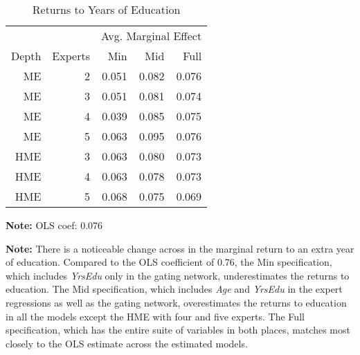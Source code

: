 \documentclass[12pt]{article}
\begin{document}
\begin{table} \centering
  \caption{Returns to Years of Education}
  \begin{threeparttable}
    \begin{tabular}[l]{r r r r r}
  \cmidrule{1-5}
        &         & \multicolumn{3}{c}{Avg. Marginal Effect} \\ 
  \cmidrule(r){3-5}
  Depth & Experts & Min   & Mid   & Full      \\
  \cmidrule{1-5}

  ME      & 2       & 0.051 & 0.082 & 0.076     \\
  ME      & 3       & 0.051 & 0.081 & 0.074     \\
  ME      & 4       & 0.039 & 0.085 & 0.075     \\
  ME      & 5       & 0.063 & 0.095 & 0.076     \\
  HME     & 3       & 0.063 & 0.080 & 0.073     \\
  HME     & 4       & 0.063 & 0.078 & 0.073     \\
  HME     & 5       & 0.068 & 0.075 & 0.069     \\

  \hline
    \end{tabular}
    \begin{tablenotes}
      \item{\footnotesize \textbf{Note:} OLS coef: 0.076}
      \item{\footnotesize \textbf{Note:} There is a noticeable change across in the marginal return to an extra year of education.
      Compared to the OLS coefficient of 0.76, the Min specification, which includes \textit{YrsEdu} only in the gating network, underestimates the returns to education.
      The Mid specification, which includes \textit{Age} and \textit{YrsEdu} in the expert regressions as well as the gating network, overestimates the returns to education in all the models except the HME with four and five experts.
      The Full specification, which has the entire suite of variables in both places, matches most closely to the OLS estimate across the estimated models.}
    \end{tablenotes} \label{tbl:YrsEdu_coef}
  \end{threeparttable}
\end{table}
\end{document}
